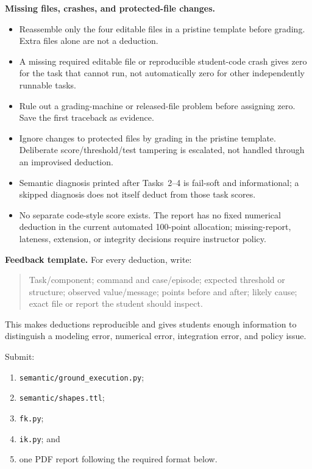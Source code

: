 \documentclass[11pt]{article}
\newcommand{\code}[1]{\nolinkurl{#1}}
\begin{document}
\begin{tutornote}
\medskip
\textbf{Missing files, crashes, and protected-file changes.}
\begin{itemize}
  \item Reassemble only the four editable files in a pristine template before
    grading. Extra files alone are not a deduction.
  \item A missing required editable file or reproducible student-code crash
    gives zero for the task that cannot run, not automatically zero for other
    independently runnable tasks.
  \item Rule out a grading-machine or released-file problem before assigning
    zero. Save the first traceback as evidence.
  \item Ignore changes to protected files by grading in the pristine template.
    Deliberate score/threshold/test tampering is escalated, not handled through
    an improvised deduction.
  \item Semantic diagnosis printed after Tasks~2--4 is fail-soft and
    informational; a skipped diagnosis does not itself deduct from those task
    scores.
  \item No separate code-style score exists. The report has no fixed numerical
    deduction in the current automated 100-point allocation; missing-report,
    lateness, extension, or integrity decisions require instructor policy.
\end{itemize}

\textbf{Feedback template.} For every deduction, write:
\begin{quote}
Task/component; command and case/episode; expected threshold or structure;
observed value/message; points before and after; likely cause; exact file or
report the student should inspect.
\end{quote}
This makes deductions reproducible and gives students enough information to
distinguish a modeling error, numerical error, integration error, and policy
issue.
\end{tutornote}

Submit:
\begin{enumerate}
  \item \code{semantic/ground_execution.py};
  \item \code{semantic/shapes.ttl};
  \item \code{fk.py};
  \item \code{ik.py}; and
  \item one PDF report following the required format below.
\end{enumerate}
\end{document}

